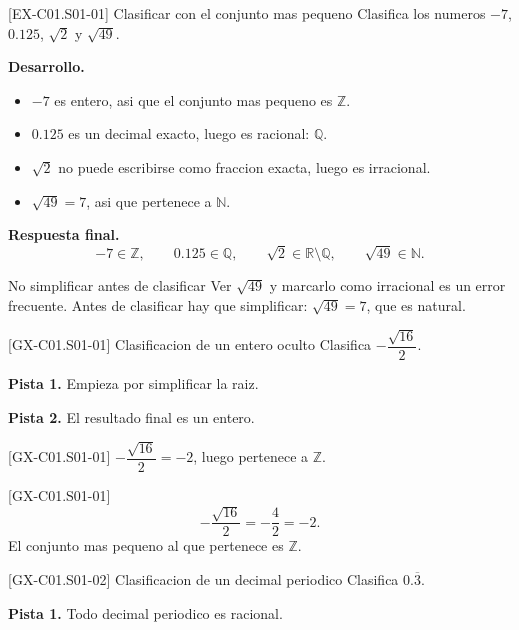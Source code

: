 \begin{solvedexample}{[EX-C01.S01-01] Clasificar con el conjunto mas pequeno}
Clasifica los numeros \(-7\), \(0.125\), \(\sqrt{2}\) y \(\sqrt{49}\).

\textbf{Desarrollo.}
\begin{itemize}
  \item \(-7\) es entero, asi que el conjunto mas pequeno es \(\mathbb{Z}\).
  \item \(0.125\) es un decimal exacto, luego es racional: \(\mathbb{Q}\).
  \item \(\sqrt{2}\) no puede escribirse como fraccion exacta, luego es irracional.
  \item \(\sqrt{49}=7\), asi que pertenece a \(\mathbb{N}\).
\end{itemize}

\textbf{Respuesta final.}
\[
-7\in\mathbb{Z},\qquad 0.125\in\mathbb{Q},\qquad \sqrt{2}\in\mathbb{R}\setminus\mathbb{Q},
\qquad \sqrt{49}\in\mathbb{N}.
\]
\end{solvedexample}

\begin{commonerror}{No simplificar antes de clasificar}
Ver \(\sqrt{49}\) y marcarlo como irracional es un error frecuente. Antes de clasificar hay que
simplificar: \(\sqrt{49}=7\), que es natural.
\end{commonerror}

\begin{guidedexercise}{[GX-C01.S01-01] Clasificacion de un entero oculto}
Clasifica \(-\dfrac{\sqrt{16}}{2}\).

\textbf{Pista 1.} Empieza por simplificar la raiz.

\textbf{Pista 2.} El resultado final es un entero.
\end{guidedexercise}

\begin{shortanswer}{[GX-C01.S01-01]}
\(-\dfrac{\sqrt{16}}{2}=-2\), luego pertenece a \(\mathbb{Z}\).
\end{shortanswer}

\begin{fullsolution}{[GX-C01.S01-01]}
\[
-\frac{\sqrt{16}}{2}=-\frac{4}{2}=-2.
\]
El conjunto mas pequeno al que pertenece es \(\mathbb{Z}\).
\end{fullsolution}

\begin{guidedexercise}{[GX-C01.S01-02] Clasificacion de un decimal periodico}
Clasifica \(0.\overline{3}\).

\textbf{Pista 1.} Todo decimal periodico es racional.
\end{guidedexercise}

